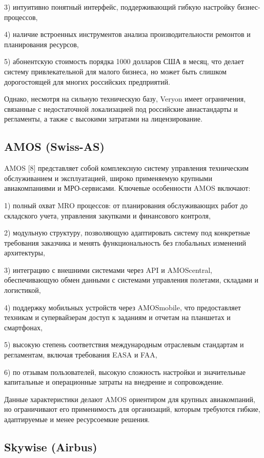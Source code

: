 \documentclass[14pt,a4paper]{extarticle}
\begin{document}
3) интуитивно понятный интерфейс, поддерживающий гибкую настройку бизнес-процессов,

4) наличие встроенных инструментов анализа производительности ремонтов и планирования ресурсов,

5) абонентскую стоимость порядка 1000 долларов США в месяц, что делает систему привлекательной для малого бизнеса, но может быть слишком дорогостоящей для многих российских предприятий.

Однако, несмотря на сильную техническую базу, Veryon имеет ограничения, связанные с недостаточной локализацией под российские авиастандарты и регламенты, а также с высокими затратами на лицензирование.

\subsection{AMOS (Swiss-AS)}

AMOS [8] представляет собой комплексную систему управления техническим обслуживанием и эксплуатацией, широко применяемую крупными авиакомпаниями и МРО-сервисами. Ключевые особенности AMOS включают:

1) полный охват MRO процессов: от планирования обслуживающих работ до складского учета, управления закупками и финансового контроля,

2) модульную структуру, позволяющую адаптировать систему под конкретные требования заказчика и менять функциональность без глобальных изменений архитектуры,

3) интеграцию с внешними системами через API и AMOScentral, обеспечивающую обмен данными с системами управления полетами, складами и логистикой,

4) поддержку мобильных устройств через AMOSmobile, что предоставляет техникам и супервайзерам доступ к заданиям и отчетам на планшетах и смартфонах,

5) высокую степень соответствия международным отраслевым стандартам и регламентам, включая требования EASA и FAA,

6) по отзывам пользователей, высокую сложность настройки и значительные капитальные и операционные затраты на внедрение и сопровождение.

Данные характеристики делают AMOS ориентиром для крупных авиакомпаний, но ограничивают его применимость для организаций, которым требуются гибкие, адаптируемые и менее ресурсоемкие решения.

\subsection{Skywise (Airbus)}
\end{document}
